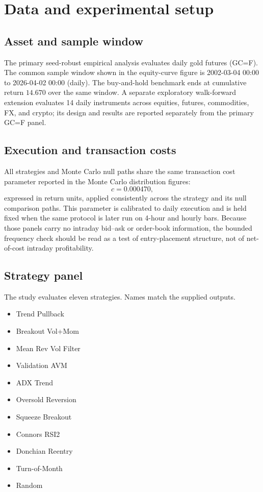 \documentclass[preprint,12pt]{elsarticle}
\theoremstyle{definition}
\begin{document}
\section{Data and experimental setup}

\subsection{Asset and sample window}

The primary seed-robust empirical analysis evaluates daily gold futures (GC=F). The common sample window shown in the equity-curve figure is 2002-03-04 00:00 to 2026-04-02 00:00 (daily). The buy-and-hold benchmark ends at cumulative return $14.670$ over the same window. A separate exploratory walk-forward extension evaluates 14 daily instruments across equities, futures, commodities, FX, and crypto; its design and results are reported separately from the primary GC=F panel.

\subsection{Execution and transaction costs}

All strategies and Monte Carlo null paths share the same transaction cost parameter reported in the Monte Carlo distribution figures:
\begin{equation}
c = 0.000470,
\end{equation}
expressed in return units, applied consistently across the strategy and its null comparison paths. This parameter is calibrated to daily execution and is held fixed when the same protocol is later run on 4-hour and hourly bars. Because those panels carry no intraday bid--ask or order-book information, the bounded frequency check should be read as a test of entry-placement structure, not of net-of-cost intraday profitability.

\subsection{Strategy panel}

The study evaluates eleven strategies. Names match the supplied outputs.

\begin{itemize}
\item Trend Pullback
\item Breakout Vol+Mom
\item Mean Rev Vol Filter
\item Validation AVM
\item ADX Trend
\item Oversold Reversion
\item Squeeze Breakout
\item Connors RSI2
\item Donchian Reentry
\item Turn-of-Month
\item Random
\end{itemize}
\end{document}
